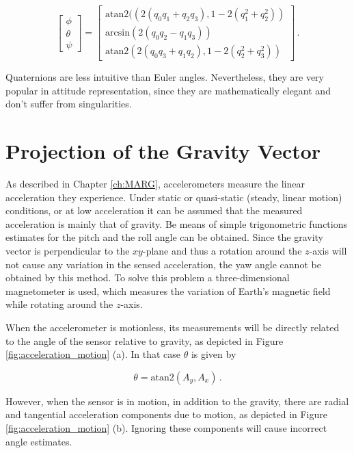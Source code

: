 \begin{equation}
  \begin{bmatrix}
\phi \\ \theta \\ \psi
\end{bmatrix} =
\begin{bmatrix}
\mbox{atan}2 ((2(q_0 q_1 + q_2 q_3), 1 - 2(q_1^2 + q_2^2)) \\
\mbox{arcsin} (2(q_0 q_2 - q_1 q_3)) \\
\mbox{atan}2 (2(q_0 q_3 + q_1 q_2), 1 - 2(q_2^2 + q_3^2))
\end{bmatrix}\,.
\end{equation}

Quaternions are less intuitive than Euler angles. Nevertheless, they are very popular in attitude representation, since they are mathematically elegant and don't suffer from singularities.

\section{Projection of the Gravity Vector}


As described in Chapter \ref{ch:MARG}, accelerometers measure the linear acceleration they experience. Under static or quasi-static (steady, linear motion) conditions, or at low acceleration it can be assumed that the measured acceleration is mainly that of gravity. Be means of simple trigonometric functions estimates for the pitch and the roll angle can be obtained. Since the gravity vector is perpendicular to the $xy$-plane and thus a rotation around the $z$-axis will not cause any variation in the sensed acceleration, the yaw angle cannot be obtained by this method. To solve this problem a three-dimensional magnetometer is used, which measures the variation of Earth's magnetic field while rotating around the $z$-axis.

When the accelerometer is motionless, its measurements will be directly related to the angle of the sensor relative to gravity, as depicted in Figure \ref{fig:acceleration_motion} (a). In that case $\theta$ is given by

\begin{equation} \label{eq:projection_gravity}
  \theta = \mbox{atan}2(A_y, A_x)\,.
\end{equation}

\noindent
However, when the sensor is in motion, in addition to the gravity, there are radial and tangential acceleration components due to motion, as depicted in Figure \ref{fig:acceleration_motion} (b). Ignoring these components will cause incorrect angle estimates.

